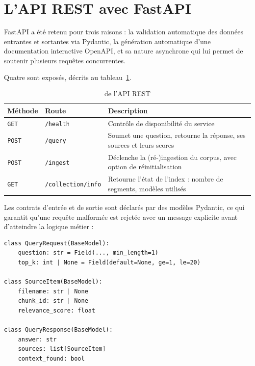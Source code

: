 \section{L'API REST avec FastAPI}

FastAPI a été retenu pour trois raisons : la validation automatique des données
entrantes et sortantes via Pydantic, la génération automatique d'une
documentation interactive OpenAPI, et sa nature asynchrone qui lui permet de
soutenir plusieurs requêtes concurrentes.

Quatre  sont exposés, décrits au tableau~\ref{tab:api}.

\begin{table}[htbp]
\centering
\caption{ de l'API REST}
\label{tab:api}
\small
\begin{tabularx}{\textwidth}{@{}llX@{}}
\toprule
\textbf{Méthode} & \textbf{Route} & \textbf{Description} \\
\midrule
\texttt{GET}  & \texttt{/health} &
Contrôle de disponibilité du service \\
\texttt{POST} & \texttt{/query} &
Soumet une question, retourne la réponse, ses sources et leurs scores \\
\texttt{POST} & \texttt{/ingest} &
Déclenche la (ré-)ingestion du corpus, avec option de réinitialisation \\
\texttt{GET}  & \texttt{/collection/info} &
Retourne l'état de l'index : nombre de segments, modèles utilisés \\
\bottomrule
\end{tabularx}
\end{table}

Les contrats d'entrée et de sortie sont déclarés par des modèles Pydantic, ce qui
garantit qu'une requête malformée est rejetée avec un message explicite avant
d'atteindre la logique métier :

\begin{lstlisting}[style=python,caption={Contrats de l'\eng{endpoint} de requête (\texttt{src/api/main.py})}]
class QueryRequest(BaseModel):
    question: str = Field(..., min_length=1)
    top_k: int | None = Field(default=None, ge=1, le=20)

class SourceItem(BaseModel):
    filename: str | None
    chunk_id: str | None
    relevance_score: float

class QueryResponse(BaseModel):
    answer: str
    sources: list[SourceItem]
    context_found: bool
\end{lstlisting}

